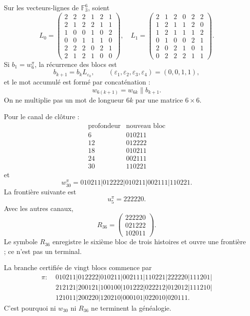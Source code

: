 Sur les vecteurs-lignes de \(\mathbb F_3^6\), soient
\[
L_0=
\begin{pmatrix}
2&2&2&1&2&1\\
2&1&2&2&1&1\\
1&0&0&1&0&2\\
0&0&1&1&1&0\\
2&2&2&0&2&1\\
2&1&2&1&0&0
\end{pmatrix},
\quad
L_1=
\begin{pmatrix}
2&1&2&0&2&2\\
1&2&1&1&2&0\\
1&2&1&1&1&2\\
0&1&0&0&2&1\\
2&0&2&1&0&1\\
0&2&2&2&1&1
\end{pmatrix}.
\]
Si \(b_1=w_6^\pi\), la récurrence des blocs est
\[
 b_{k+1}=b_kL_{\varepsilon_k},
 \qquad
 (\varepsilon_1,\varepsilon_2,\varepsilon_3,\varepsilon_4)=(0,0,1,1),
\]
et le mot accumulé est formé par concaténation :
\[
 w_{6(k+1)}=w_{6k}\mathbin{\|}b_{k+1}.
\]
On ne multiplie pas un mot de longueur \(6k\) par une matrice \(6\times6\).

Pour le canal de clôture :
\[
\begin{array}{c|c}
\text{profondeur}&\text{nouveau bloc}\\ \hline
6&010211\\
12&012222\\
18&010211\\
24&002111\\
30&110221
\end{array}
\]
et
\begin{equation}
 \boxed{
 w_{30}^{\pi}
 =010211|012222|010211|002111|110221.}
 \label{gfp:b:eq:w30-pi-autonomo}
\end{equation}
La frontière suivante est
\[
 u_5^\pi=222220.
\]
Avec les autres canaux,
\[
 R_{36}=
 \begin{pmatrix}
 222220\\021222\\102011
 \end{pmatrix}.
\]
Le symbole \(R_{36}\) enregistre le sixième bloc de trois histoires et ouvre une
frontière ; ce n’est pas un terminal.

La branche certifiée de vingt blocs commence par
\begin{align*}
\pi:\;&010211|012222|010211|002111|110221|222220|111201|\\
&212121|200121|100100|101222|022212|012012|111210|\\
&121011|200220|120210|000101|022010|020111.
\end{align*}
C’est pourquoi ni \(w_{30}\) ni \(R_{36}\) ne terminent la généalogie.

